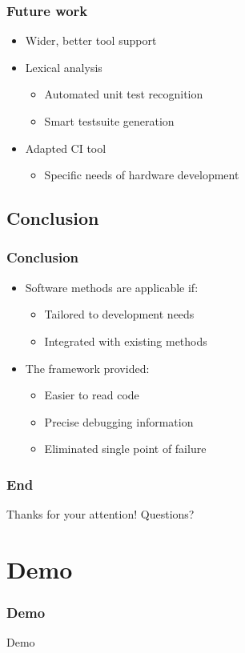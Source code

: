 \documentclass[british,10pt]{beamer}
\begin{document}
\begin{frame}\frametitle{Future work}
\begin{itemize}
\item Wider, better tool support
\item Lexical analysis
\begin{itemize}
\item Automated unit test recognition
\item Smart testsuite generation
\end{itemize}
\item Adapted CI tool
\begin{itemize}
\item Specific needs of hardware development
\end{itemize}
\end{itemize}
\end{frame}

\subsection{Conclusion}

\begin{frame}\frametitle{Conclusion}
\begin{itemize}
\item Software methods are applicable if:
\begin{itemize}
\item Tailored to development needs
\item Integrated with existing methods
\end{itemize}
\vskip3pt
\item The framework provided:
\begin{itemize}
\item Easier to read code
\item Precise debugging information
\item Eliminated single point of failure
\end{itemize}
\end{itemize}
\end{frame}


\begin{frame}\frametitle{End}
\centering
\Large
Thanks for your attention!
\vskip20pt
Questions?
\end{frame}

\section{Demo}
\begin{frame}\frametitle{Demo}
\centering
\Huge Demo
\end{frame}
\end{document}
